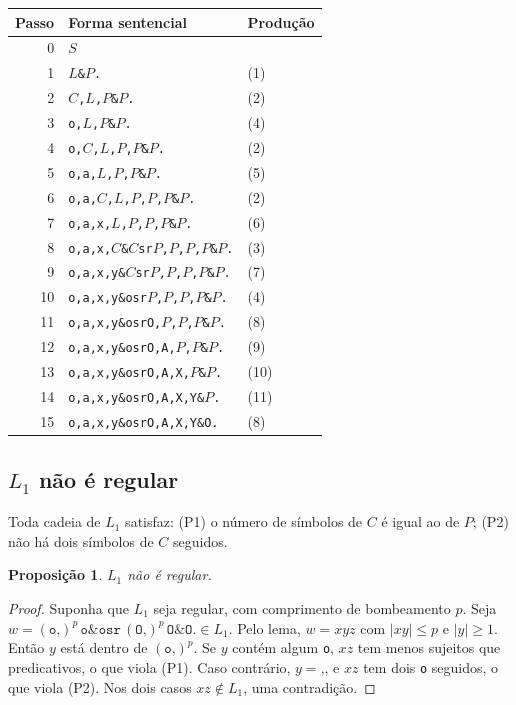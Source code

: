 \documentclass[11pt,a4paper]{article}
\newcommand{\cad}[1]{\texttt{#1}}       %
\newcommand{\Lum}{L_1}
\newtheorem*{prop}{Proposição}
\begin{document}
\begin{center}
\begin{tabular}{rll}
\toprule
Passo & Forma sentencial & Produção \\
\midrule
0 & $S$ & \\
1 & $L$\cad{\&}$P$\cad{.} & (1) \\
2 & $C$\cad{,}$L$\cad{,}$P$\cad{\&}$P$\cad{.} & (2) \\
3 & \cad{o,}$L$\cad{,}$P$\cad{\&}$P$\cad{.} & (4) \\
4 & \cad{o,}$C$\cad{,}$L$\cad{,}$P$\cad{,}$P$\cad{\&}$P$\cad{.} & (2) \\
5 & \cad{o,a,}$L$\cad{,}$P$\cad{,}$P$\cad{\&}$P$\cad{.} & (5) \\
6 & \cad{o,a,}$C$\cad{,}$L$\cad{,}$P$\cad{,}$P$\cad{,}$P$\cad{\&}$P$\cad{.} & (2) \\
7 & \cad{o,a,x,}$L$\cad{,}$P$\cad{,}$P$\cad{,}$P$\cad{\&}$P$\cad{.} & (6) \\
8 & \cad{o,a,x,}$C$\cad{\&}$C$\cad{sr}$P$\cad{,}$P$\cad{,}$P$\cad{,}$P$\cad{\&}$P$\cad{.} & (3) \\
9 & \cad{o,a,x,y\&}$C$\cad{sr}$P$\cad{,}$P$\cad{,}$P$\cad{,}$P$\cad{\&}$P$\cad{.} & (7) \\
10 & \cad{o,a,x,y\&osr}$P$\cad{,}$P$\cad{,}$P$\cad{,}$P$\cad{\&}$P$\cad{.} & (4) \\
11 & \cad{o,a,x,y\&osrO,}$P$\cad{,}$P$\cad{,}$P$\cad{\&}$P$\cad{.} & (8) \\
12 & \cad{o,a,x,y\&osrO,A,}$P$\cad{,}$P$\cad{\&}$P$\cad{.} & (9) \\
13 & \cad{o,a,x,y\&osrO,A,X,}$P$\cad{\&}$P$\cad{.} & (10) \\
14 & \cad{o,a,x,y\&osrO,A,X,Y\&}$P$\cad{.} & (11) \\
15 & \cad{o,a,x,y\&osrO,A,X,Y\&O.} & (8) \\
\bottomrule
\end{tabular}
\end{center}

\subsection{$\Lum$ não é regular}

Toda cadeia de $\Lum$ satisfaz: (P1) o número de símbolos de $C$ é igual ao de $P$; (P2) não há dois símbolos de $C$ seguidos.

\begin{prop}
$\Lum$ não é regular.
\end{prop}
\begin{proof}
Suponha que $\Lum$ seja regular, com comprimento de bombeamento $p$. Seja $w=(\cad{o,})^p\,\cad{o\&osr}\,(\cad{O,})^p\,\cad{O\&O.}\in\Lum$. Pelo lema, $w=xyz$ com $|xy|\le p$ e $|y|\ge1$. Então $y$ está dentro de $(\cad{o,})^p$. Se $y$ contém algum \cad{o}, $xz$ tem menos sujeitos que predicativos, o que viola (P1). Caso contrário, $y=\cad{,}$, e $xz$ tem dois \cad{o} seguidos, o que viola (P2). Nos dois casos $xz\notin\Lum$, uma contradição.
\end{proof}
\end{document}

